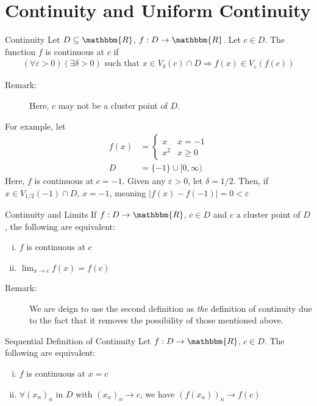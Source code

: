 \documentclass[10pt]{extarticle}
\newcommand{\R}{\mathbbm{R}}
\begin{document}
  \section*{Continuity and Uniform Continuity}%
  \begin{problem}{Continuity}
    Let $D\subseteq \R$, $f: D\rightarrow \R$. Let $c\in D$. The function $f$ is continuous at $c$ if
    \begin{align*}
      (\forall \varepsilon > 0)(\exists \delta > 0) \text{ such that } x\in V_{\delta}(c) \cap D \Rightarrow f(x) \in V_{\varepsilon}(f(c))
    \end{align*}
    \begin{description}
      \item[Remark:] Here, $c$ may not be a cluster point of $D$.
    \end{description}
    For example, let
    \begin{align*}
      f(x) &= \begin{cases}
        x & x = -1\\
        x^2 & x \geq 0
      \end{cases}\\
        D &= \{-1\} \cup [0,\infty)
    \end{align*}
    Here, $f$ is continuous at $c = -1$. Given any $\varepsilon > 0$, let $\delta = 1/2$. Then, if $x\in V_{1/2}(-1)\cap D$, $x = -1$, meaning $|f(x) - f(-1)| = 0 < \varepsilon$
  \end{problem}
  \begin{problem}{Continuity and Limits}
    If $f: D\rightarrow \R$, $c\in D$ and $c$ a cluster point of $D$, the following are equivalent:
    \begin{enumerate}[(i)]
      \item $f$ is continuous at $c$
      \item $\lim_{x\rightarrow c} f(x) = f(c)$
    \end{enumerate}
    \begin{description}
      \item[Remark:] We are deign to use the second definition as \textit{the} definition of continuity due to the fact that it removes the possibility of those mentioned above.
    \end{description}
  \end{problem}
  \begin{problem}{Sequential Definition of Continuity}
    Let $f:D\rightarrow \R$, $c\in D$. The following are equivalent:
    \begin{enumerate}[(i)]
      \item $f$ is continuous at $x = c$
      \item $\forall (x_n)_n$ in $D$ with $(x_n)_n \rightarrow c$, we have $(f(x_n))_n \rightarrow f(c)$
    \end{enumerate}
  \end{problem}
\end{document}
